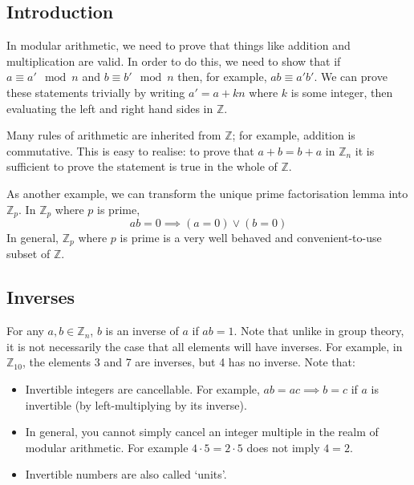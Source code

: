 \subsection{Introduction}
In modular arithmetic, we need to prove that things like addition and multiplication are valid.
In order to do this, we need to show that if \(a \equiv a' \mod n\) and \(b \equiv b' \mod n\) then, for example, \(ab \equiv a'b'\).
We can prove these statements trivially by writing \(a' = a + kn\) where \(k\) is some integer, then evaluating the left and right hand sides in \(\mathbb Z\).

Many rules of arithmetic are inherited from \(\mathbb Z\); for example, addition is commutative.
This is easy to realise: to prove that \(a + b = b + a\) in \(\mathbb Z_n\) it is sufficient to prove the statement is true in the whole of \(\mathbb Z\).

As another example, we can transform the unique prime factorisation lemma into \(\mathbb Z_p\).
In \(\mathbb Z_p\) where \(p\) is prime,
\[
	ab = 0 \implies (a = 0) \lor (b = 0)
\]
In general, \(\mathbb Z_p\) where \(p\) is prime is a very well behaved and convenient-to-use subset of \(\mathbb Z\).

\subsection{Inverses}
For any \(a, b \in \mathbb Z_n\), \(b\) is an inverse of \(a\) if \(ab=1\).
Note that unlike in group theory, it is not necessarily the case that all elements will have inverses.
For example, in \(\mathbb Z_{10}\), the elements 3 and 7 are inverses, but 4 has no inverse.
Note that:
\begin{itemize}
	\item Invertible integers are cancellable.
	      For example, \(ab=ac \implies b=c\) if \(a\) is invertible (by left-multiplying by its inverse).
	\item In general, you cannot simply cancel an integer multiple in the realm of modular arithmetic.
	      For example \(4 \cdot 5 = 2 \cdot 5 \) does not imply \( 4 = 2\).
	\item Invertible numbers are also called `units'.
\end{itemize}

